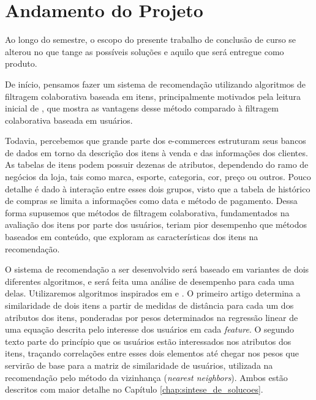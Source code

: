 \chapter[Andamento do Projeto]{Andamento do Projeto}
\label{chap:andamento_do_projeto}


Ao longo do semestre, o escopo do presente trabalho de conclusão de curso se alterou no que tange as possíveis soluções e aquilo que será entregue como produto.

De início, pensamos fazer um sistema de recomendação utilizando algoritmos de filtragem colaborativa baseada em itens, principalmente motivados pela leitura inicial de \cite{linden2003amazon}, que mostra as vantagens desse método comparado à filtragem colaborativa baseada em usuários. 

Todavia, percebemos que grande parte dos e-commerces estruturam seus bancos de dados em torno da descrição dos itens à venda e das informações dos clientes. As tabelas de itens podem possuir dezenas de atributos, dependendo do ramo de negócios da loja, tais como marca, esporte, categoria, cor, preço ou outros. Pouco detalhe é dado à interação entre esses dois grupos, visto que a tabela de histórico de compras se limita a informações como data e método de pagamento. Dessa forma supusemos que métodos de filtragem colaborativa, fundamentados na avaliação dos itens por parte dos usuários, teriam pior desempenho que métodos baseados em conteúdo, que exploram as características dos itens na recomendação. 

O sistema de recomendação a ser desenvolvido será baseado em variantes de dois diferentes algoritmos, e será feita uma análise de desempenho  para cada uma delas. Utilizaremos algoritmos inspirados em \cite{debnath2008feature} e \cite{symeonidis2007feature}. O primeiro artigo determina a similaridade de dois itens a partir de medidas de distância para cada um dos atributos dos itens, ponderadas por pesos determinados na regressão linear de uma equação descrita pelo interesse dos usuários em cada \textit{feature}. O segundo texto parte do princípio que os usuários estão interessados nos atributos dos itens, traçando correlações entre esses dois elementos até chegar nos pesos que servirão de base para a matriz de similaridade de usuários, utilizada na recomendação pelo método da vizinhança (\textit{nearest neighbors}). Ambos estão descritos com maior detalhe no Capítulo \ref{chap:sintese_de_solucoes}.